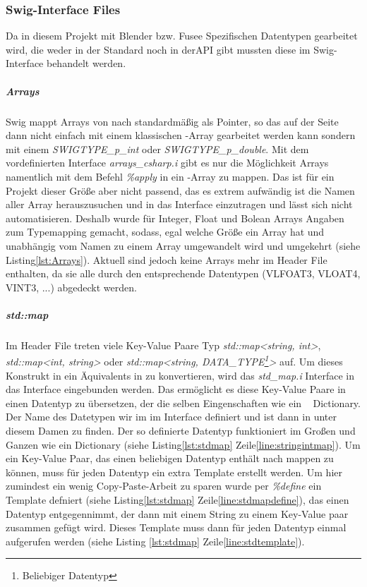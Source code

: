 \subsubsection{Swig-Interface Files}\label{subsubsec:swiginterface}
Da in diesem Projekt mit Blender bzw. Fusee Spezifischen Datentypen gearbeitet wird, die weder in der Standard \CC noch in der\CS API gibt mussten diese im Swig-Interface behandelt werden. 

\subparagraph{Arrays}
Swig mappt Arrays von \CC nach \CS standardmäßig als Pointer, so das auf der \CS Seite dann nicht einfach mit einem klassischen \CS-Array gearbeitet werden kann sondern mit einem \emph{SWIGTYPE\_p\_int} oder \emph{SWIGTYPE\_p\_double}. Mit dem vordefinierten Interface \emph{arrays\_csharp.i} gibt es nur die Möglichkeit Arrays namentlich mit dem Befehl \emph{\%apply} in ein \CS-Array zu mappen. Das ist für ein Projekt dieser Größe aber nicht passend, das es extrem aufwändig ist die Namen aller Array herauszusuchen und in das Interface einzutragen und lässt sich nicht automatisieren. Deshalb wurde für Integer, Float und Bolean Arrays Angaben zum Typemapping gemacht, sodass, egal welche Größe ein Array hat und unabhängig vom Namen zu einem \CS Array umgewandelt wird und umgekehrt (siehe Listing\ref{lst:Arrays}). Aktuell sind jedoch keine Arrays mehr im Header File enthalten, da sie alle durch den entsprechende Datentypen (VLFOAT3, VLOAT4, VINT3, ...) abgedeckt werden.

\begin{code}[caption={Beispiel Arraymapping},label={lst:Arrays}, escapechar=|]
\end{code}

\subparagraph{std::map}

Im Header File treten viele Key-Value Paare Typ \emph{std::map<string, int>}, \emph{std::map<int, string>} oder \emph{std::map<string, DATA\_TYPE\footnote{Beliebiger Datentyp}>} auf. Um dieses Konstrukt in ein Äquivalents in \CS zu konvertieren, wird das \emph{std\_map.i} Interface in das Interface eingebunden werden. Das ermöglicht es diese Key-Value Paare in einen Datentyp zu übersetzen, der die selben Eingenschaften wie ein \CS~ Dictionary. Der Name des Datetypen wir im im Interface definiert und ist dann in \CS unter diesem Damen zu finden. Der so definierte Datentyp funktioniert im Großen und Ganzen wie ein Dictionary (siehe Listing\ref{lst:stdmap} Zeile\ref{line:stringintmap}). Um ein Key-Value Paar, das einen beliebigen Datentyp enthält nach \CS mappen zu können, muss für jeden Datentyp ein extra Template erstellt werden. Um hier zumindest ein wenig Copy-Paste-Arbeit zu sparen wurde per \emph{\%define} ein Template defniert (siehe Listing\ref{lst:stdmap} Zeile\ref{line:stdmapdefine}), das einen Datentyp entgegennimmt, der dann mit einem String zu einem Key-Value paar zusammen gefügt wird. Dieses Template muss dann für jeden Datentyp einmal aufgerufen werden (siehe Listing \ref{lst:stdmap} Zeile\ref{line:stdtemplate}). 

